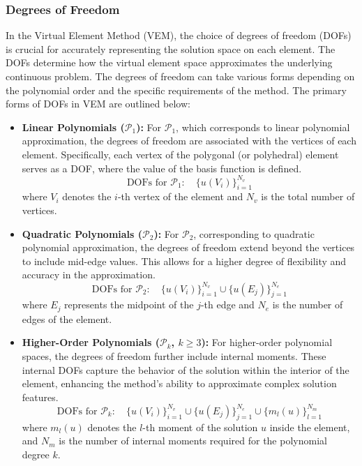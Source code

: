 \documentclass[class=article, crop=false]{standalone}
\begin{document}
\subsubsection{Degrees of Freedom}
In the Virtual Element Method (VEM), the choice of degrees of freedom (DOFs) is crucial for accurately representing the solution space on each element. The DOFs determine how the virtual element space approximates the underlying continuous problem. The degrees of freedom can take various forms depending on the polynomial order and the specific requirements of the method. The primary forms of DOFs in VEM are outlined below:

\begin{itemize}
    \item \textbf{Linear Polynomials ($\mathcal{P}_1$):}
    For $\mathcal{P}_1$, which corresponds to linear polynomial approximation, the degrees of freedom are associated with the vertices of each element. Specifically, each vertex of the polygonal (or polyhedral) element serves as a DOF, where the value of the basis function is defined.
    $$
    \text{DOFs for } \mathcal{P}_1: \quad \{ u(V_i) \}_{i=1}^{N_v}
    $$
    where $V_i$ denotes the $i$-th vertex of the element and $N_v$ is the total number of vertices.

    \item \textbf{Quadratic Polynomials ($\mathcal{P}_2$):}
    For $\mathcal{P}_2$, corresponding to quadratic polynomial approximation, the degrees of freedom extend beyond the vertices to include mid-edge values. This allows for a higher degree of flexibility and accuracy in the approximation.
    $$
    \text{DOFs for } \mathcal{P}_2: \quad \{ u(V_i) \}_{i=1}^{N_v} \cup \{ u(E_j) \}_{j=1}^{N_e}
    $$
    where $E_j$ represents the midpoint of the $j$-th edge and $N_e$ is the number of edges of the element.

    \item \textbf{Higher-Order Polynomials ($\mathcal{P}_k$, $k \geq 3$):}
    For higher-order polynomial spaces, the degrees of freedom further include internal moments. These internal DOFs capture the behavior of the solution within the interior of the element, enhancing the method's ability to approximate complex solution features.
    $$
    \text{DOFs for } \mathcal{P}_k: \quad \{ u(V_i) \}_{i=1}^{N_v} \cup \{ u(E_j) \}_{j=1}^{N_e} \cup \{ m_l(u) \}_{l=1}^{N_m}
    $$
    where $m_l(u)$ denotes the $l$-th moment of the solution $u$ inside the element, and $N_m$ is the number of internal moments required for the polynomial degree $k$.


\end{itemize}
\end{document}
